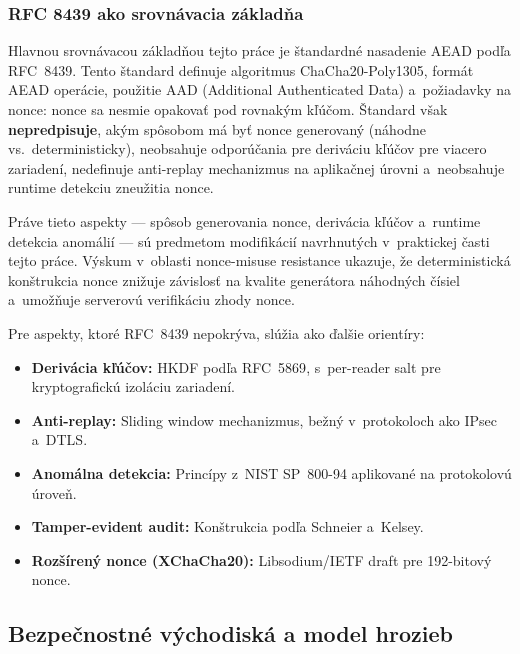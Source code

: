\subsubsection{RFC 8439 ako srovnávacia základňa}

Hlavnou srovnávacou základňou tejto práce je štandardné nasadenie AEAD podľa RFC~8439\cite{RFC8439}. Tento štandard definuje algoritmus ChaCha20-Poly1305, formát AEAD operácie, použitie AAD (Additional Authenticated Data) a~požiadavky na nonce: nonce sa nesmie opakovať pod rovnakým kľúčom\cite{RFC5116}. Štandard však \textbf{nepredpisuje}, akým spôsobom má byť nonce generovaný (náhodne vs.\ deterministicky), neobsahuje odporúčania pre deriváciu kľúčov pre viacero zariadení, nedefinuje anti-replay mechanizmus na aplikačnej úrovni a~neobsahuje runtime detekciu zneužitia nonce.

Práve tieto aspekty --- spôsob generovania nonce, derivácia kľúčov a~runtime detekcia anomálií --- sú predmetom modifikácií navrhnutých v~praktickej časti tejto práce. Výskum v~oblasti nonce-misuse resistance\cite{RogawayNonceMisuse2004,BellareNonceMisuse2006} ukazuje, že deterministická konštrukcia nonce znižuje závislosť na kvalite generátora náhodných čísiel a~umožňuje serverovú verifikáciu zhody nonce.

Pre aspekty, ktoré RFC~8439 nepokrýva, slúžia ako ďalšie orientíry:
\begin{itemize}[leftmargin=*,itemsep=2pt]
  \item \textbf{Derivácia kľúčov:} HKDF podľa RFC~5869\cite{RFC5869}, s~per-reader salt pre kryptografickú izoláciu zariadení.
  \item \textbf{Anti-replay:} Sliding window mechanizmus, bežný v~protokoloch ako IPsec a~DTLS\cite{RFC5116}.
  \item \textbf{Anomálna detekcia:} Princípy z~NIST SP~800-94\cite{NIST80094} aplikované na protokolovú úroveň.
  \item \textbf{Tamper-evident audit:} Konštrukcia podľa Schneier a~Kelsey\cite{SchneierKelsey1999}.
  \item \textbf{Rozšírený nonce (XChaCha20):} Libsodium/IETF draft\cite{XChaChaDraft,LibsodiumXChaChaDoc} pre 192-bitový nonce.
\end{itemize}


\subsection{Bezpečnostné východiská a model hrozieb}

